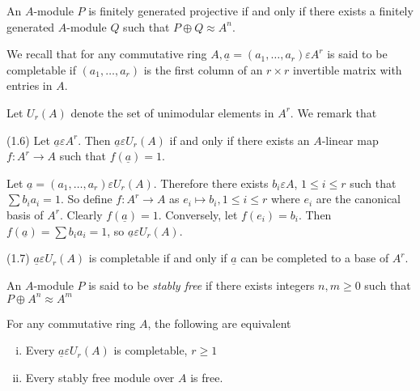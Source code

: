 \begin{rem}\label{c4:rem1.5}
An $A$-module $P$ is finitely generated projective if and only if
there exists a finitely generated $A$-module $Q$ such that $P\oplus
Q\approx A^{n}$. 

We recall that for any commutative ring
$A,\underline{a}=(a_1,\ldots,a_r)\varepsilon A^{r}$ is said to be
completable if $(a_1,\ldots,a_r)$ is the first column of an $r\times
r$ invertible matrix with entries in $A$. 

Let $U_r(A)$ denote the set of unimodular elements in $A^{r}$. We
remark that 

(1.6) Let $\underline{a}\varepsilon A^{r}$. Then
$\underline{a}\varepsilon U_r(A)$ if and only if there exists an
$A$-linear map $f:A^{r}\rightarrow A$ such that $f(\underline{a})=1$. 
\end{rem}

\begin{Proof}
Let $\underline{a}=(a_1,\ldots,a_r)\varepsilon U_r(A)$. Therefore
there exists $b_i\varepsilon A$, $1\leq i \leq r$ such that $\sum
b_ia_i=1$. So define $f:A^{r}\rightarrow A$ as $e_i\mapsto b_i,1\leq
i\leq r$ where $e_i$ are the canonical basis of $A^{r}$. Clearly
$f(\underline{a})=1$. Conversely, let $f(e_i)=b_i$. Then
$f(\underline{a})=\sum b_ia_i=1$, so $\underline{a}\varepsilon
U_r(A)$. 

(1.7) $\underline{a}\varepsilon U_r(A)$ is completable if and only if
$\underline{a}$ can be completed to a base of $A^{r}$. 
\enprf
\end{Proof}

\setcounter{dfn}{7}
\begin{dfn}\label{c4:dfn1.8}
An $A$-module $P$ is said to be \textit{stably free} if there exists
integers $n,m\geq 0$ such that $P\oplus A^{n}\approx A^{m}$
\end{dfn}

\begin{Prop}\label{c4:Prop1.9}
For any commutative ring $A$, the following are equivalent
\begin{enumerate}[(i)]
\item Every $\underline{a}\varepsilon U_r(A)$ is completable, $r\geq
  1$
\item Every stably free module over $A$ is free.
\end{enumerate}
\end{Prop}

